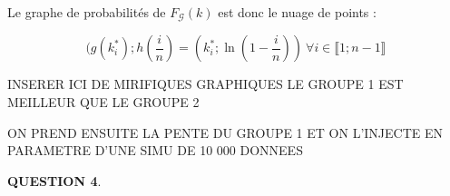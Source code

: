\documentclass[a4paper,11pt]{article}
\newcommand{\quest}[1]{\small\textbf{#1}\normalsize}
\theoremstyle{nonumberplain}
\theoremstyle{nonumberplain}
\theoremstyle{nonumberplain}
\begin{document}
        \medskip
        Le graphe de probabilités de $F_\mathcal{G}(k)$ est donc le nuage de points :

          \[
              (g(k_i^*); h(\frac{i}{n}) = (k_i^*; \ln(1 - \frac{i}{n}))\ \forall i \in \llbracket 1; n - 1 \rrbracket
          \]

        INSERER ICI DE MIRIFIQUES GRAPHIQUES
        LE GROUPE 1 EST MEILLEUR QUE LE GROUPE 2

        ON PREND ENSUITE LA PENTE DU GROUPE 1
        ET ON L'INJECTE EN PARAMETRE D'UNE SIMU DE 10 000 DONNEES


      \quest{QUESTION 4}. 
\end{document}
